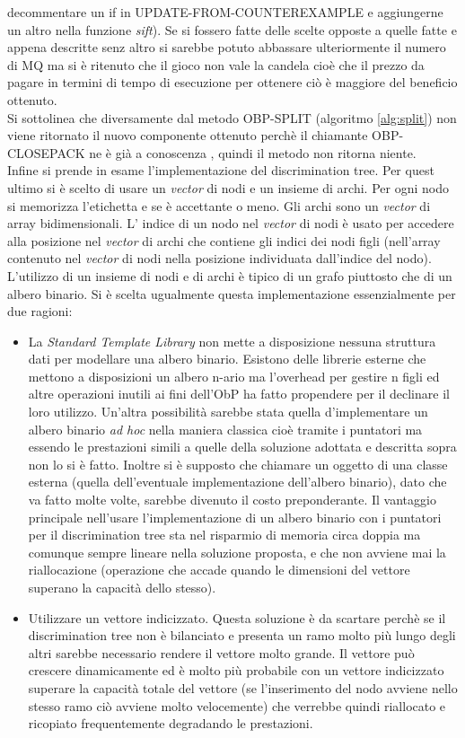 decommentare un if  in UPDATE-FROM-COUNTEREXAMPLE e aggiungerne un altro nella funzione \textit{sift}). Se si fossero fatte delle scelte opposte a quelle fatte e appena descritte senz altro si sarebbe potuto abbassare ulteriormente il numero di \ac{MQ} ma si è ritenuto che il gioco non vale la candela cioè che il prezzo da pagare in termini di tempo di esecuzione per ottenere ciò è maggiore del beneficio ottenuto.\\
Si sottolinea che diversamente dal metodo OBP-SPLIT (algoritmo \ref{alg:split}) non viene ritornato il nuovo componente ottenuto perchè il chiamante OBP-CLOSEPACK ne è già a conoscenza , quindi il metodo non ritorna niente.\\
Infine si prende in esame l'implementazione del discrimination tree. Per quest ultimo si è scelto di usare un \textit{vector} di nodi e un insieme di archi. Per ogni nodo si memorizza l'etichetta e se è accettante o meno. Gli archi sono un \textit{vector} di array bidimensionali. L' indice di un nodo nel \textit{vector} di nodi è usato per accedere alla posizione nel \textit{vector} di archi che contiene gli indici dei nodi figli (nell'array contenuto nel \textit{vector} di nodi nella posizione individuata dall'indice del nodo). L'utilizzo di un insieme di nodi e di archi è tipico di un grafo piuttosto che di un albero binario. Si è scelta ugualmente questa implementazione essenzialmente per due ragioni:
\begin{itemize}
\item La \textit{Standard Template Library} non mette a disposizione nessuna struttura dati per modellare una albero binario. Esistono delle librerie esterne che mettono a disposizioni un albero n-ario ma l'overhead per gestire n figli ed altre operazioni inutili ai fini dell'\ac{ObP} ha fatto propendere per il declinare il loro utilizzo. Un'altra possibilità sarebbe stata quella d'implementare un albero binario \textit{ad hoc} nella maniera classica cioè tramite i puntatori ma essendo le prestazioni simili a quelle della soluzione adottata e descritta sopra non lo si è fatto. Inoltre si è supposto che chiamare un oggetto di una classe esterna (quella dell'eventuale implementazione dell'albero binario), dato che va fatto molte volte, sarebbe divenuto il costo preponderante. Il vantaggio principale nell'usare l'implementazione di un albero binario con i puntatori per il discrimination tree sta nel risparmio di memoria circa doppia ma comunque sempre lineare nella soluzione proposta, e che non avviene mai la riallocazione (operazione che accade quando le dimensioni del vettore superano la capacità dello stesso).
\item Utilizzare un vettore indicizzato. Questa soluzione è da scartare perchè se il discrimination tree non è bilanciato e presenta un ramo molto più lungo degli altri sarebbe necessario rendere il vettore molto grande. Il vettore può crescere dinamicamente ed è molto più probabile con un vettore indicizzato superare la capacità totale del vettore (se l'inserimento del nodo avviene nello stesso ramo ciò avviene molto velocemente) che verrebbe quindi riallocato e ricopiato frequentemente degradando le prestazioni.
\end{itemize} 
 
